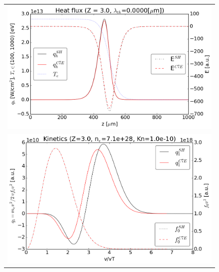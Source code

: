 \documentclass[preprint,12pt]{elsarticle}
\begin{document}
\begin{figure}[tbh]
  \begin{center}
    \begin{tabular}{c}
      \includegraphics[width=1.0\textwidth]{../results/fe_analysis/C7E/P5_heatflux_Z3_fullF.png} \\ 
      \includegraphics[width=1.0\textwidth]{../results/fe_analysis/C7E/P5_kinetics_Z3_fullF.png}
    \end{tabular}
  \caption{
  }
  \end{center}
  \label{fig:AWBScorrection_f1}
\end{figure}
\end{document}
